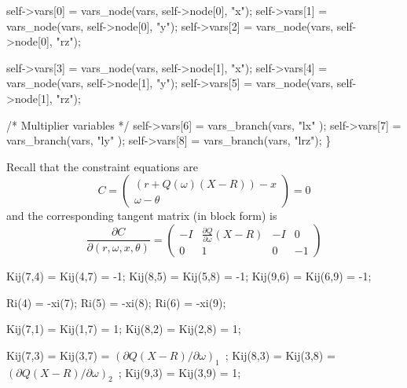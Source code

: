     self->vars[0] = vars_node(vars, self->node[0], "x");
    self->vars[1] = vars_node(vars, self->node[0], "y");
    self->vars[2] = vars_node(vars, self->node[0], "rz");

    self->vars[3] = vars_node(vars, self->node[1], "x");
    self->vars[4] = vars_node(vars, self->node[1], "y");
    self->vars[5] = vars_node(vars, self->node[1], "rz");

    /* Multiplier variables */
    self->vars[6] = vars_branch(vars, "lx" );
    self->vars[7] = vars_branch(vars, "ly" );
    self->vars[8] = vars_branch(vars, "lrz");
\}

\nwendcode{}\nwdocspar

Recall that the constraint equations are
\[
  C = 
  \begin{pmatrix}
    (r + Q(\omega) (X-R)) - x \\
    \omega - \theta
  \end{pmatrix} = 0
\]
and the corresponding tangent matrix (in block form) is
\[
  \frac{\partial C}{\partial (r, \omega, x, \theta)} =
    \begin{pmatrix}
      -I & \frac{\partial Q}{\partial \omega} (X-R) & -I &  0 \\
       0 & 1                                        &  0 & -1
    \end{pmatrix}
\]

\nwenddocs{}\endmoddef
Kij(7,4) = Kij(4,7) = -1;
Kij(8,5) = Kij(5,8) = -1;
Kij(9,6) = Kij(6,9) = -1;
\nwendcode{}\nwdocspar

\nwenddocs{}\endmoddef
Ri(4) = -xi(7);
Ri(5) = -xi(8);
Ri(6) = -xi(9);
\nwendcode{}\nwdocspar

\nwenddocs{}\endmoddef
Kij(7,1) = Kij(1,7) =  1;
Kij(8,2) = Kij(2,8) =  1;

Kij(7,3) = Kij(3,7) = \LA{}$(\partial Q(X-R) / \partial \omega)_1$~{\nwtagstyle{}}\RA{};
Kij(8,3) = Kij(3,8) = \LA{}$(\partial Q(X-R) / \partial \omega)_2$~{\nwtagstyle{}}\RA{};
Kij(9,3) = Kij(3,9) =  1;

